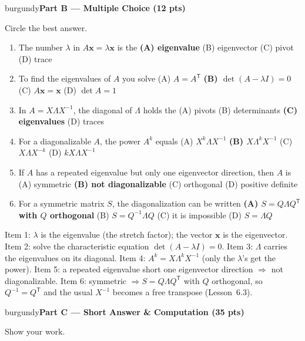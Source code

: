 \documentclass[10pt]{article}
\newcommand{\xx}{\mathbf{x}}
\newcommand{\T}{^{\mathsf T}}
\newcommand{\parthead}[1]{%
  \vspace{6pt}\noindent
  \begin{headlinebox}{burgundy}{\color{white}\bfseries #1}\end{headlinebox}%
  \vspace{4pt}}
\begin{document}
\parthead{Part B --- Multiple Choice (12 pts)}
Circle the best answer.

\begin{enumerate}[leftmargin=1.9em, itemsep=9pt]
  \item The number $\lambda$ in $A\xx=\lambda\xx$ is the
    \hfill \textbf{(A) eigenvalue} \ans{$\leftarrow$} \quad (B) eigenvector \quad (C) pivot \quad (D) trace
  \item To find the eigenvalues of $A$ you solve
    \hfill (A) $A=A\T$ \quad \textbf{(B) $\det(A-\lambda I)=0$} \ans{$\leftarrow$} \quad (C) $A\xx=\xx$ \quad (D) $\det A=1$
  \item In $A=X\Lambda X^{-1}$, the diagonal of $\Lambda$ holds the
    \hfill (A) pivots \quad (B) determinants \quad \textbf{(C) eigenvalues} \ans{$\leftarrow$} \quad (D) traces
  \item For a diagonalizable $A$, the power $A^k$ equals
    \hfill (A) $X^k\Lambda X^{-1}$ \quad \textbf{(B) $X\Lambda^k X^{-1}$} \ans{$\leftarrow$} \quad (C) $X\Lambda X^{-k}$ \quad (D) $kX\Lambda X^{-1}$
  \item If $A$ has a repeated eigenvalue but only one eigenvector direction, then $A$ is
    \hfill (A) symmetric \quad \textbf{(B) not diagonalizable} \ans{$\leftarrow$} \quad (C) orthogonal \quad (D) positive definite
  \item For a symmetric matrix $S$, the diagonalization can be written
    \hfill \textbf{(A) $S=Q\Lambda Q\T$ with $Q$ orthogonal} \ans{$\leftarrow$} \quad (B) $S=Q^{-1}\Lambda Q$ \quad (C) it is impossible \quad (D) $S=\Lambda Q$
\end{enumerate}

\begin{teachernote}
Item 1: $\lambda$ is the eigenvalue (the stretch factor); the vector $\xx$ is the eigenvector. Item 2: solve the
characteristic equation $\det(A-\lambda I)=0$. Item 3: $\Lambda$ carries the eigenvalues on its diagonal.
Item 4: $A^k=X\Lambda^k X^{-1}$ (only the $\lambda$'s get the power). Item 5: a repeated eigenvalue short one
eigenvector direction $\Rightarrow$ not diagonalizable. Item 6: symmetric $\Rightarrow S=Q\Lambda Q\T$ with
$Q$ orthogonal, so $Q^{-1}=Q\T$ and the usual $X^{-1}$ becomes a free transpose (Lesson~6.3).
\end{teachernote}

\parthead{Part C --- Short Answer \& Computation (35 pts)}
Show your work.
\end{document}
